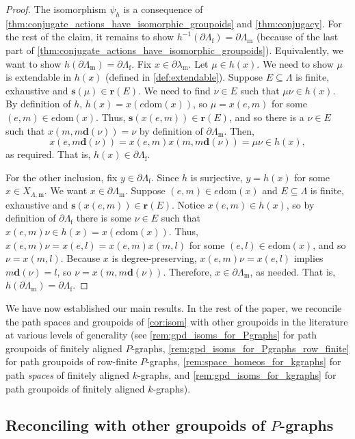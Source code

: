 \documentclass[11pt]{amsart}
\theoremstyle{definition}
\numberwithin{thm}{section}
\numberwithin{equation}{section}
\newcommand{\emphasis}[1]{\textit{#1}}
\newcommand{\range}{\mathbf{r}}
\newcommand{\source}{\mathbf{s}}
\newcommand{\degree}{\mathbf{d}}
\newcommand{\morphdom}[1]{\mathrm{dom}(#1)}
\newcommand{\M}{\mathrm{m}}
\newcommand{\F}{\mathrm{f}}
\newcommand{\PS}[2]{X_{#2, #1}}
\newcommand{\BPS}[2]{\partial{#2}_{#1}}
\begin{document}
\begin{proof}
The isomorphism $\psi_h$ is a consequence of \cref{thm:conjugate_actions_have_isomorphic_groupoids} and \cref{thm:conjugacy}. 
For the rest of the claim, it remains to show $h^{-1}(\BPS{\F}{\Lambda}) = \BPS{\M}{\Lambda}$ (because of the last part of \cref{thm:conjugate_actions_have_isomorphic_groupoids}).
Equivalently, we want to show $h(\BPS{\M}{\Lambda}) = \BPS{\F}{\Lambda}$.
Fix $x \in \BPS{\M}{\lambda}$.
Let $\mu \in h(x)$. 
We need to show $\mu$ is extendable in $h(x)$ (defined in \cref{def:extendable}).
Suppose $E \subseteq \Lambda$ is finite, exhaustive and $\source(\mu) \in \range(E)$.
We need to find $\nu \in E$ such that $\mu\nu \in h(x)$.
By definition of $h$, $h(x) = x(e\morphdom{x})$, so $\mu = x(e, m)$ for some $(e, m) \in e\morphdom{x}$.
Thus, $\source(x(e, m)) \in \range(E)$, and so there is a $\nu \in E$ such that $x(m, m\degree(\nu)) = \nu$ by definition of $\BPS{\M}{\Lambda}$.
Then, 
\[
x(e, m\degree(\nu)) 
= x(e, m)x(m, m\degree(\nu)) 
= \mu\nu 
\in h(x),
\] 
as required. 
That is, $h(x) \in \BPS{\F}{\Lambda}$.

For the other inclusion, fix $y \in \BPS{\F}{\Lambda}$.
Since $h$ is surjective, $y = h(x)$ for some $x \in \PS{\M}{\Lambda}$.
We want $x \in \BPS{\M}{\Lambda}$.
Suppose $(e, m) \in e\morphdom{x}$ and $E \subseteq \Lambda$ is finite, exhaustive and $\source(x(e, m)) \in \range(E)$.
Notice $x(e, m) \in h(x)$, so by definition of $\BPS{\F}{\Lambda}$ there is some $\nu \in E$ such that $x(e, m)\nu \in h(x) = x(e\morphdom{x})$.
Thus, $x(e, m)\nu = x(e, l) = x(e, m)x(m, l)$ for some $(e, l) \in e\morphdom{x}$, and so $\nu = x(m, l)$.
Because $x$ is degree-preserving, $x(e, m)\nu = x(e, l)$ implies $m\degree(\nu) = l$, so $\nu = x(m, m\degree(\nu))$.
Therefore, $x \in \BPS{\M}{\Lambda}$, as needed. 
That is, $h(\BPS{\M}{\Lambda}) = \BPS{\F}{\Lambda}$.
\end{proof}

We have now established our main results. In the rest of the paper, we reconcile the path spaces and groupoids of \cref{cor:isom} with other groupoids in the literature at various levels of generality (see \cref{rem:gpd_isoms_for_Pgraphs} for path groupoids of finitely aligned $P$-graphs, \cref{rem:gpd_isoms_for_Pgraphs_row_finite} for path groupoids of row-finite $P$-graphs, \cref{rem:space_homeos_for_kgraphs} for path \emphasis{spaces} of finitely aligned $k$-graphs, and \cref{rem:gpd_isoms_for_kgraphs} for path groupoids of finitely aligned 
$k$-graphs).

\subsection{Reconciling with other groupoids of \texorpdfstring{$P$-graphs}{P-graphs}}
\end{document}

